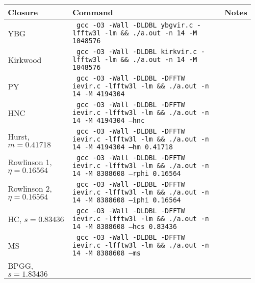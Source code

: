 \documentclass[preprint]{revtex4-1}
\numberwithin{equation}{subsection}
\numberwithin{table}{section}
\begin{document}
\begin{table}\footnotesize
  \begin{tabular}{p{3cm} p{11cm} p{2cm}}
  Closure
  &
  Command
  &
  Notes \\
  \hline
  YBG
  &
  \texttt{
    gcc -O3 -Wall -DLDBL ybgvir.c -lfftw3l -lm
    \newline
    \&\& ./a.out -n 14 -M 1048576
  }
  &
  \\
  Kirkwood
  &
  \texttt{
    gcc -O3 -Wall -DLDBL kirkvir.c -lfftw3l -lm
    \newline
    \&\& ./a.out -n 14 -M 1048576
  }
  &
  \\
  PY
  &
  \texttt{
    gcc -O3 -Wall -DLDBL -DFFTW ievir.c -lfftw3l -lm
    \newline
    \&\& ./a.out -n 14 -M 4194304
  }
  &
  \\
  HNC
  &
  \texttt{
    gcc -O3 -Wall -DLDBL -DFFTW ievir.c -lfftw3l -lm
    \newline
    \&\& ./a.out -n 14 -M 4194304 --hnc
  }
  &
  \\
  Hurst, \newline
    $m = 0.41718$
  &
  \texttt{
    gcc -O3 -Wall -DLDBL -DFFTW ievir.c -lfftw3l -lm
    \newline
    \&\& ./a.out -n 14 -M 4194304 --hm 0.41718
  }
  &
  \\
  Rowlinson 1, \newline
    $\eta = 0.16564$
  &
  \texttt{
    gcc -O3 -Wall -DLDBL -DFFTW ievir.c -lfftw3l -lm
    \newline
    \&\& ./a.out -n 14 -M 8388608 --rphi 0.16564
  }
  &
  \\
  Rowlinson 2, \newline
    $\eta = 0.16564$
  &
  \texttt{
    gcc -O3 -Wall -DLDBL -DFFTW ievir.c -lfftw3l -lm
    \newline
    \&\& ./a.out -n 14 -M 8388608 --iphi 0.16564
  }
  &
  \\
  HC, \newline
    $s = 0.83436$
  &
  \texttt{
    gcc -O3 -Wall -DLDBL -DFFTW ievir.c -lfftw3l -lm
    \newline
    \&\& ./a.out -n 14 -M 8388608 --hcs 0.83436
  }
  &
  \\
  MS
  &
  \texttt{
    gcc -O3 -Wall -DLDBL -DFFTW ievir.c -lfftw3l -lm
    \newline
    \&\& ./a.out -n 14 -M 8388608 --ms
  }
  &
  \\
  BPGG, \newline
  $s = 1.83436$
  &
  \texttt{
}
\end{tabular}
\end{table}
\end{document}
